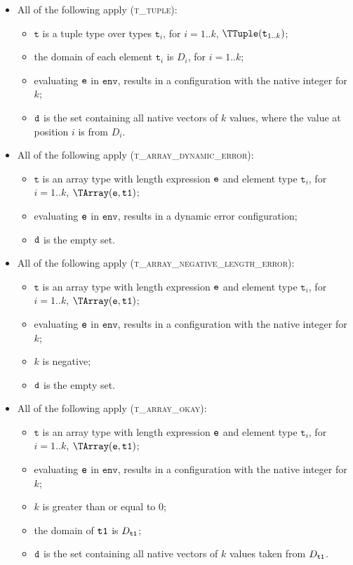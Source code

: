\documentclass{book}
\newcommand\env[0]{\texttt{env}}
\newcommand\vt[0]{\texttt{t}}
\begin{document}
\begin{itemize}
  \item All of the following apply (\textsc{t\_tuple}):
  \begin{itemize}
    \item $\vt$ is a tuple type over types $\vt_i$, for $i=1..k$, $\TTuple(\vt_{1..k})$;
    \item the domain of each element $\vt_i$ is $D_i$, for $i=1..k$;
    \item evaluating $\texttt{e}$ in $\env$, results in a configuration with the native integer for $k$;
    \item $\texttt{d}$ is the set containing all native vectors of $k$ values, where the value at position $i$
    is from $D_i$.
  \end{itemize}

  \item All of the following apply (\textsc{t\_array\_dynamic\_error}):
  \begin{itemize}
    \item $\vt$ is an array type with length expression $\texttt{e}$ and element type $\vt_i$, for $i=1..k$, $\TArray(\ve, \vtone)$;
    \item evaluating $\texttt{e}$ in $\env$, results in a dynamic error configuration;
    \item $\texttt{d}$ is the empty set.
  \end{itemize}

  \item All of the following apply (\textsc{t\_array\_negative\_length\_error}):
  \begin{itemize}
    \item $\vt$ is an array type with length expression $\texttt{e}$ and element type $\vt_i$, for $i=1..k$, $\TArray(\ve, \vtone)$;
    \item evaluating $\texttt{e}$ in $\env$, results in a configuration with the native integer for $k$;
    \item $k$ is negative;
    \item $\texttt{d}$ is the empty set.
  \end{itemize}

  \item All of the following apply (\textsc{t\_array\_okay}):
  \begin{itemize}
    \item $\vt$ is an array type with length expression $\texttt{e}$ and element type $\vt_i$, for $i=1..k$, $\TArray(\ve, \vtone)$;
    \item evaluating $\texttt{e}$ in $\env$, results in a configuration with the native integer for $k$;
    \item $k$ is greater than or equal to $0$;
    \item the domain of $\texttt{t1}$ is $D_{\texttt{t1}}$;
    \item $\texttt{d}$ is the set containing all native vectors of $k$ values taken from $D_{\texttt{t1}}$.
  \end{itemize}


\end{itemize}
\end{document}
